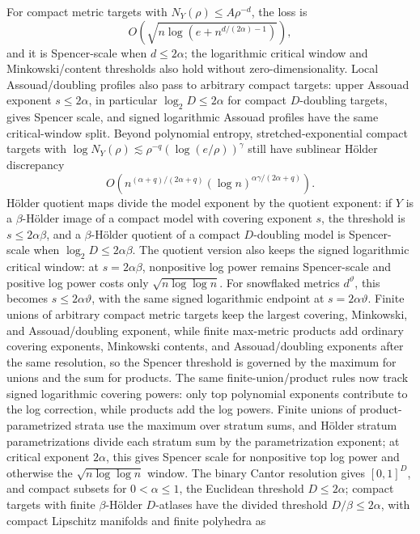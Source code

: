 \documentclass[11pt]{article}
\begin{document}
For compact metric targets with \(N_Y(\rho)\le A\rho^{-d}\), the loss is
\[
  O\!\left(\sqrt{n\log(e+n^{d/(2\alpha)-1})}\right),
\]
and it is Spencer-scale when \(d\le2\alpha\); the logarithmic critical window
and Minkowski/content thresholds also hold without zero-dimensionality.  Local
Assouad/doubling
profiles also pass to arbitrary compact targets: upper Assouad exponent
\(s\le2\alpha\), in particular \(\log_2D\le2\alpha\) for compact
\(D\)-doubling targets, gives Spencer scale, and signed logarithmic Assouad
profiles have the same critical-window split.  Beyond polynomial entropy,
stretched-exponential compact targets with
\(\log N_Y(\rho)\lesssim\rho^{-q}(\log(e/\rho))^\gamma\) still have sublinear
H\"older discrepancy
\[
  O\!\left(n^{(\alpha+q)/(2\alpha+q)}
    (\log n)^{\alpha\gamma/(2\alpha+q)}\right).
\]
H\"older quotient maps divide
the model exponent by the quotient exponent: if \(Y\) is a
\(\beta\)-H\"older image of a compact model with covering exponent \(s\), the
threshold is \(s\le2\alpha\beta\), and a \(\beta\)-H\"older quotient of a
compact \(D\)-doubling model is Spencer-scale when
\(\log_2D\le2\alpha\beta\).  The quotient version also keeps the signed
logarithmic critical window: at \(s=2\alpha\beta\), nonpositive log power remains
Spencer-scale and positive log power costs only \(\sqrt{n\log\log n}\).  For
snowflaked metrics \(d^\vartheta\), this becomes \(s\le2\alpha\vartheta\),
with the same signed logarithmic endpoint at \(s=2\alpha\vartheta\).
Finite unions of arbitrary
compact metric targets keep the largest covering, Minkowski, and
Assouad/doubling exponent, while finite max-metric products add ordinary
covering exponents, Minkowski contents, and Assouad/doubling exponents after
the same resolution, so the Spencer threshold is governed by the maximum for
unions and the sum for products.  The same finite-union/product rules now track
signed logarithmic covering powers: only top polynomial exponents contribute to
the log correction, while products add the log powers.  Finite unions of
product-parametrized strata use the maximum over stratum sums, and H\"older
stratum parametrizations divide each stratum sum by the parametrization
exponent; at critical exponent \(2\alpha\), this gives Spencer scale for
nonpositive top log power and otherwise the
\(\sqrt{n\log\log n}\) window.  The binary Cantor
resolution gives \([0,1]^D\), and compact subsets for \(0<\alpha\le1\), the
Euclidean threshold \(D\le2\alpha\); compact targets with finite
\(\beta\)-H\"older \(D\)-atlases have the divided threshold
\(D/\beta\le2\alpha\), with compact Lipschitz manifolds and finite polyhedra as
\end{document}
